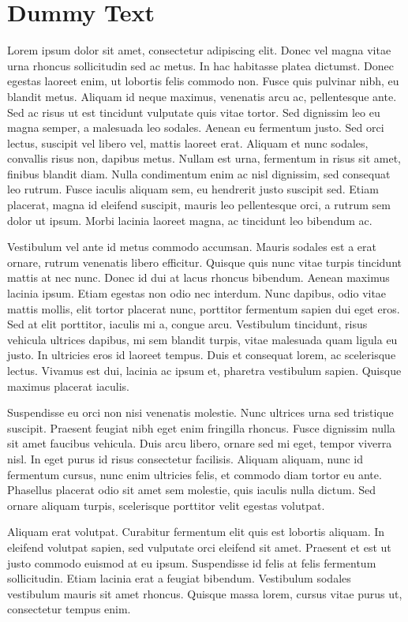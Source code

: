 \documentclass[12pt]{article}
\begin{document}
\section{Dummy Text}

Lorem ipsum dolor sit amet, consectetur adipiscing elit. Donec vel magna vitae urna rhoncus sollicitudin sed ac metus. In hac habitasse platea dictumst. Donec egestas laoreet enim, ut lobortis felis commodo non. Fusce quis pulvinar nibh, eu blandit metus. Aliquam id neque maximus, venenatis arcu ac, pellentesque ante. Sed ac risus ut est tincidunt vulputate quis vitae tortor. Sed dignissim leo eu magna semper, a malesuada leo sodales. Aenean eu fermentum justo. Sed orci lectus, suscipit vel libero vel, mattis laoreet erat. Aliquam et nunc sodales, convallis risus non, dapibus metus. Nullam est urna, fermentum in risus sit amet, finibus blandit diam. Nulla condimentum enim ac nisl dignissim, sed consequat leo rutrum. Fusce iaculis aliquam sem, eu hendrerit justo suscipit sed. Etiam placerat, magna id eleifend suscipit, mauris leo pellentesque orci, a rutrum sem dolor ut ipsum. Morbi lacinia laoreet magna, ac tincidunt leo bibendum ac.

Vestibulum vel ante id metus commodo accumsan. Mauris sodales est a erat ornare, rutrum venenatis libero efficitur. Quisque quis nunc vitae turpis tincidunt mattis at nec nunc. Donec id dui at lacus rhoncus bibendum. Aenean maximus lacinia ipsum. Etiam egestas non odio nec interdum. Nunc dapibus, odio vitae mattis mollis, elit tortor placerat nunc, porttitor fermentum sapien dui eget eros. Sed at elit porttitor, iaculis mi a, congue arcu. Vestibulum tincidunt, risus vehicula ultrices dapibus, mi sem blandit turpis, vitae malesuada quam ligula eu justo. In ultricies eros id laoreet tempus. Duis et consequat lorem, ac scelerisque lectus. Vivamus est dui, lacinia ac ipsum et, pharetra vestibulum sapien. Quisque maximus placerat iaculis.

Suspendisse eu orci non nisi venenatis molestie. Nunc ultrices urna sed tristique suscipit. Praesent feugiat nibh eget enim fringilla rhoncus. Fusce dignissim nulla sit amet faucibus vehicula. Duis arcu libero, ornare sed mi eget, tempor viverra nisl. In eget purus id risus consectetur facilisis. Aliquam aliquam, nunc id fermentum cursus, nunc enim ultricies felis, et commodo diam tortor eu ante. Phasellus placerat odio sit amet sem molestie, quis iaculis nulla dictum. Sed ornare aliquam turpis, scelerisque porttitor velit egestas volutpat.

Aliquam erat volutpat. Curabitur fermentum elit quis est lobortis aliquam. In eleifend volutpat sapien, sed vulputate orci eleifend sit amet. Praesent et est ut justo commodo euismod at eu ipsum. Suspendisse id felis at felis fermentum sollicitudin. Etiam lacinia erat a feugiat bibendum. Vestibulum sodales vestibulum mauris sit amet rhoncus. Quisque massa lorem, cursus vitae purus ut, consectetur tempus enim.
\end{document}
